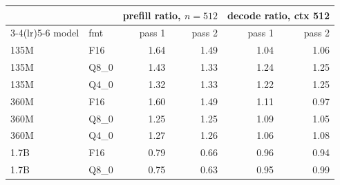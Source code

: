 \begin{tabular}{llrrrr}\toprule
 & & \multicolumn{2}{c}{prefill ratio, $n{=}512$} & \multicolumn{2}{c}{decode ratio, ctx 512}\\
\cmidrule(lr){3-4}\cmidrule(lr){5-6}
model & fmt & pass 1 & pass 2 & pass 1 & pass 2\\\midrule
135M & F16 & 1.64 & 1.49 & 1.04 & 1.06\\
135M & Q8\_0 & 1.43 & 1.33 & 1.24 & 1.25\\
135M & Q4\_0 & 1.32 & 1.33 & 1.22 & 1.25\\
360M & F16 & 1.60 & 1.49 & 1.11 & 0.97\\
360M & Q8\_0 & 1.25 & 1.25 & 1.09 & 1.05\\
360M & Q4\_0 & 1.27 & 1.26 & 1.06 & 1.08\\
1.7B & F16 & 0.79 & 0.66 & 0.96 & 0.94\\
1.7B & Q8\_0 & 0.75 & 0.63 & 0.95 & 0.99\\
\bottomrule\end{tabular}